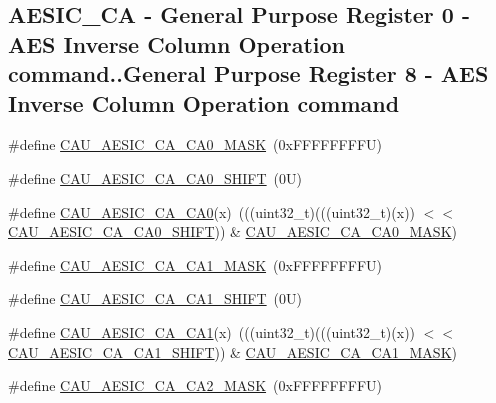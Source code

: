 \subsection*{A\+E\+S\+I\+C\+\_\+\+CA -\/ General Purpose Register 0 -\/ A\+ES Inverse Column Operation command..General Purpose Register 8 -\/ A\+ES Inverse Column Operation command}
\begin{DoxyCompactItemize}
\item 
\#define \mbox{\hyperlink{group___c_a_u___register___masks_gaf4f3bf1111180d2452151c2c954968ff}{C\+A\+U\+\_\+\+A\+E\+S\+I\+C\+\_\+\+C\+A\+\_\+\+C\+A0\+\_\+\+M\+A\+SK}}~(0x\+F\+F\+F\+F\+F\+F\+F\+F\+U)
\item 
\#define \mbox{\hyperlink{group___c_a_u___register___masks_gab82f969160eac7bf345cc29560bf2a0a}{C\+A\+U\+\_\+\+A\+E\+S\+I\+C\+\_\+\+C\+A\+\_\+\+C\+A0\+\_\+\+S\+H\+I\+FT}}~(0\+U)
\item 
\#define \mbox{\hyperlink{group___c_a_u___register___masks_gab75a178dc0778fcd48c2287d288ed5c2}{C\+A\+U\+\_\+\+A\+E\+S\+I\+C\+\_\+\+C\+A\+\_\+\+C\+A0}}(x)~(((uint32\+\_\+t)(((uint32\+\_\+t)(x)) $<$$<$ \mbox{\hyperlink{group___c_a_u___register___masks_gab82f969160eac7bf345cc29560bf2a0a}{C\+A\+U\+\_\+\+A\+E\+S\+I\+C\+\_\+\+C\+A\+\_\+\+C\+A0\+\_\+\+S\+H\+I\+FT}})) \& \mbox{\hyperlink{group___c_a_u___register___masks_gaf4f3bf1111180d2452151c2c954968ff}{C\+A\+U\+\_\+\+A\+E\+S\+I\+C\+\_\+\+C\+A\+\_\+\+C\+A0\+\_\+\+M\+A\+SK}})
\item 
\#define \mbox{\hyperlink{group___c_a_u___register___masks_gace8bbcda7b100e6febb77206a0b294ca}{C\+A\+U\+\_\+\+A\+E\+S\+I\+C\+\_\+\+C\+A\+\_\+\+C\+A1\+\_\+\+M\+A\+SK}}~(0x\+F\+F\+F\+F\+F\+F\+F\+F\+U)
\item 
\#define \mbox{\hyperlink{group___c_a_u___register___masks_gaf213071e5350ac7fb8d15b65685e8fa8}{C\+A\+U\+\_\+\+A\+E\+S\+I\+C\+\_\+\+C\+A\+\_\+\+C\+A1\+\_\+\+S\+H\+I\+FT}}~(0\+U)
\item 
\#define \mbox{\hyperlink{group___c_a_u___register___masks_ga7c110676eacf3149cb4a6912d40377e9}{C\+A\+U\+\_\+\+A\+E\+S\+I\+C\+\_\+\+C\+A\+\_\+\+C\+A1}}(x)~(((uint32\+\_\+t)(((uint32\+\_\+t)(x)) $<$$<$ \mbox{\hyperlink{group___c_a_u___register___masks_gaf213071e5350ac7fb8d15b65685e8fa8}{C\+A\+U\+\_\+\+A\+E\+S\+I\+C\+\_\+\+C\+A\+\_\+\+C\+A1\+\_\+\+S\+H\+I\+FT}})) \& \mbox{\hyperlink{group___c_a_u___register___masks_gace8bbcda7b100e6febb77206a0b294ca}{C\+A\+U\+\_\+\+A\+E\+S\+I\+C\+\_\+\+C\+A\+\_\+\+C\+A1\+\_\+\+M\+A\+SK}})
\item 
\#define \mbox{\hyperlink{group___c_a_u___register___masks_gaacb6f7c612e15617ec7318cff9480c0f}{C\+A\+U\+\_\+\+A\+E\+S\+I\+C\+\_\+\+C\+A\+\_\+\+C\+A2\+\_\+\+M\+A\+SK}}~(0x\+F\+F\+F\+F\+F\+F\+F\+F\+U)

\end{DoxyCompactItemize}
